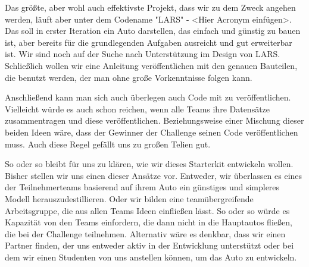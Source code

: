 Das größte, aber wohl auch effektivste Projekt, dass wir zu dem Zweck angehen werden,
läuft aber unter dem Codename "LARS" - <Hier Acronym einfügen>.
Das soll in erster Iteration ein Auto darstellen, das einfach und günstig zu bauen ist,
aber bereits für die grundlegenden Aufgaben ausreicht und gut erweiterbar ist.
Wir sind noch auf der Suche nach Unterstützung im Design von LARS. 
Schließlich wollen wir eine Anleitung veröffentlichen mit den genauen
Bauteilen, die benutzt werden, der man ohne große Vorkenntnisse 
folgen kann.

Anschließend kann man sich auch überlegen auch Code mit zu veröffentlichen.
Vielleicht würde es auch schon reichen, wenn alle Teams ihre Datensätze zusammentragen 
und diese veröffentlichen. Beziehungsweise einer Mischung dieser beiden Ideen wäre,
dass der Gewinner der Challenge seinen Code veröffentlichen muss.
Auch diese Regel gefällt uns zu großen Telien gut.

So oder so bleibt für uns zu klären, wie wir dieses Starterkit entwickeln wollen.
Bisher stellen wir uns einen dieser Ansätze vor.
Entweder, wir überlassen es eines der Teilnehmerteams basierend auf ihrem Auto ein 
günstiges und simpleres Modell herauszudestillieren. 
Oder wir bilden eine teamübergreifende Arbeitsgruppe, die aus allen Teams
Ideen einfließen lässt.
So oder so würde es Kapazität von den Teams einfordern, die dann nicht in die 
Hauptautos fließen, die bei der Challenge teilnehmen.
Alternativ wäre es denkbar, dass wir einen Partner finden, der uns entweder aktiv
in der Entwicklung unterstützt oder bei dem wir einen Studenten von uns anstellen
können, um das Auto zu entwickeln.
